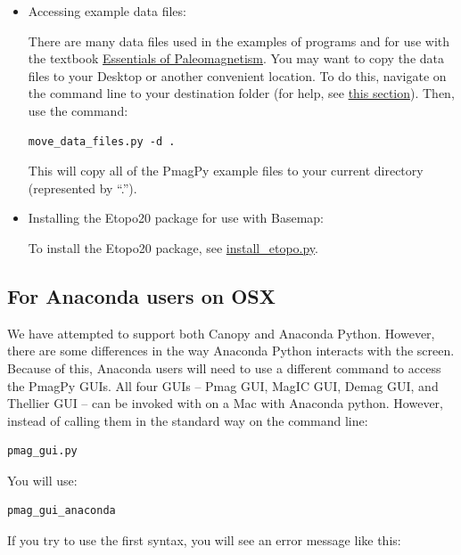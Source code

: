 \documentclass[11pt]{book}
\begin{document}
{\begin{itemize}
If you don't see the Pmag GUI window, make sure you have followed all the install directions correctly, and check the \href{#trouble}{Trouble Shooting} section.  If you are stumped, please create a \href{https://github.com/PmagPy/PmagPy/issues}{Github issue}.

\item Accessing example data files:

   There are many data files used in the examples of programs and for use with the textbook  \href{http://earthref.org/MAGIC/books/Tauxe/Essentials/WebBook3.html}{Essentials of Paleomagnetism}.     You may want to copy  the data files to your Desktop or another convenient location.
   To do this, navigate on the command line to your destination folder (for help, see \href{#file_system}{this section}).  Then, use the command: \begin{verbatim}move_data_files.py -d .\end{verbatim} This will copy all of the PmagPy example files to your current directory (represented by ``.'').

\item Installing the Etopo20 package for use with Basemap:

To install the Etopo20 package, see \href{#install_etopo.py}{install\_etopo.py}.

   \end{itemize}


    \subsection {For Anaconda users on OSX}
    We have attempted to support both Canopy and Anaconda Python.  However, there are some differences in the way Anaconda Python interacts with the screen. Because of this, Anaconda users will need to use a different command to access the PmagPy GUIs.  All four GUIs -- Pmag GUI, MagIC GUI, Demag GUI, and Thellier GUI -- can be invoked with on a Mac with Anaconda python.  However, instead of calling them in the standard way on the command line:

\begin{verbatim}
pmag_gui.py
\end{verbatim}

You will use:

\begin{verbatim}
pmag_gui_anaconda
\end{verbatim}

If you try to use the first syntax, you will see an error message like this:

}
\end{document}
